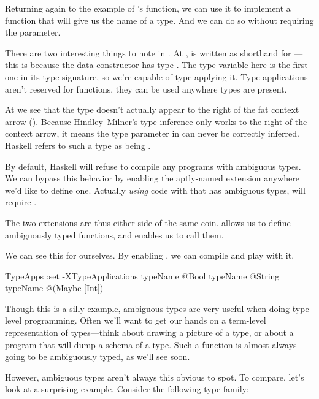\documentclass[book.tex]{subfiles}
\begin{document}
Returning again to the example of 's  function, we
can use it to implement a function that will give us the name of a type. And we
can do so without requiring the  parameter.


There are two interesting things to note in . At ,  is written as shorthand for ---this is because the
 data constructor has type . The type variable  here
is the first one in its type signature, so we're capable of type applying it.
Type applications aren't reserved for functions, they can be used anywhere types
are present.

At  we see that the type  doesn't actually appear to the right of
the fat context arrow (\hs{=>}). Because Hindley--Milner's type inference only
works to the right of the context arrow, it means the type parameter  in
 can never be correctly inferred. Haskell refers to such a type as
being .

By default, Haskell will refuse to compile any programs with ambiguous types. We
can bypass this behavior by enabling the aptly-named 
extension anywhere we'd like to define one. Actually \emph{using} code with that
has ambiguous types, will require .

The two extensions are thus either side of the same coin.
 allows us to define ambiguously typed functions, and
 enables us to call them.

We can see this for ourselves. By enabling , we can
compile  and play with it.

\begin{dorepl}{TypeApps}
:set -XTypeApplications
typeName @Bool
typeName @String
typeName @(Maybe [Int])
\end{dorepl}

Though this is a silly example, ambiguous types are very useful when doing
type-level programming. Often we'll want to get our hands on a term-level
representation of types---think about drawing a picture of a type, or about a
program that will dump a schema of a type. Such a function is almost always
going to be ambiguously typed, as we'll see soon.

However, ambiguous types aren't always this obvious to spot. To compare, let's
look at a surprising example. Consider the following type family:
\end{document}
